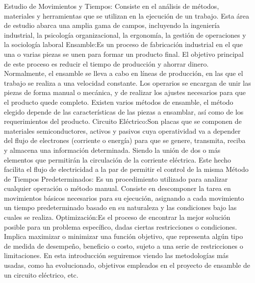 Estudio de Movimientos y Tiempos: Consiste  en el análisis de métodos, materiales y herramientas que se utilizan en la ejecución de un trabajo. Esta área de estudio abarca una amplia gama de campos, incluyendo la ingeniería industrial, la psicología organizacional, la ergonomía, la gestión de operaciones y la sociología laboral\cite{carlos2016ingenieria}
Ensamble:Es un proceso de fabricación industrial en el que una o varias piezas se unen para formar un producto final. El objetivo principal de este proceso es reducir el tiempo de producción y ahorrar dinero.
Normalmente, el ensamble se lleva a cabo en líneas de producción, en las que el trabajo se realiza a una velocidad constante. Los operarios se encargan de unir las piezas de forma manual o mecánica, y de realizar los ajustes necesarios para que el producto quede completo.
Existen varios métodos de ensamble, el método elegido depende de las características de las piezas a ensamblar, así como de los requerimientos del producto.
Circuito Eléctrico:Son placas que se componen de materiales semiconductores, activos y pasivos cuya operatividad va a depender del flujo de electrones (corriente o energía) para que se  genere, transmita, reciba y almacena una información determinada. Siendo  la unión de dos o más elementos que permitirán la circulación de la corriente eléctrica. Este hecho facilita el flujo de electricidad a la par de permitir el control de la misma
Método de Tiempos Predeterminados: Es un procedimiento utilizado para analizar cualquier operación o método manual. Consiste en descomponer la tarea en movimientos básicos necesarios para su ejecución, asignando a cada movimiento un tiempo predeterminado basado en su naturaleza y las condiciones bajo las cuales se realiza.
Optimización:Es el proceso de encontrar la mejor solución posible para un problema específico, dadas ciertas restricciones o condiciones. Implica maximizar o minimizar una función objetivo, que representa algún tipo de medida de desempeño, beneficio o costo, sujeto a una serie de restricciones o limitaciones. En esta introducción seguiremos viendo las metodologías más usadas, como ha evolucionado, objetivos empleados en el  proyecto de ensamble de un circuito eléctrico, etc.
